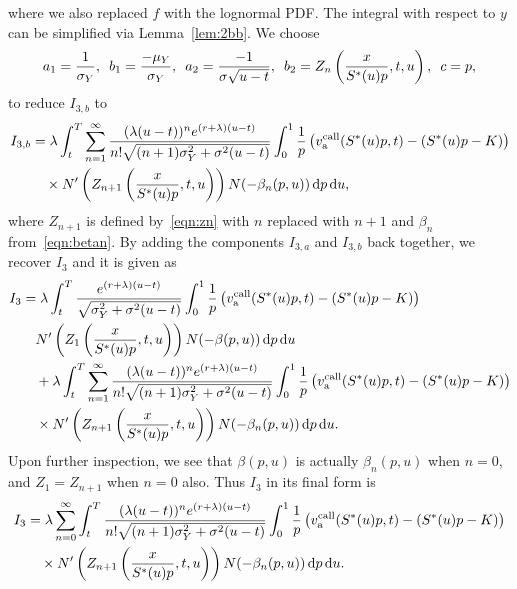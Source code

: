 		where we also replaced $f$ with the lognormal PDF. The integral with respect to $y$ can be simplified via Lemma~\ref{lem:2bb}. We choose
		$$
			a_1 = \frac{1}{\sigma_Y}, \enskip b_1 = \frac{-\mu_Y}{\sigma_Y}, \enskip a_2 = \frac{-1}{\sigma\sqrt{u-t}}, \enskip
			b_2 = Z_n\left( \frac{x}{S^*(u)p}, t, u \right), \enskip c = p,
		$$
		to reduce $I_{3,b}$ to
		\begin{align*}
			I_{3,b} &= \lambda \int_t^T \displaystyle\sum\limits_{n=1}^{\infty} \frac{(\lambda(u-t))^ne^{(r+\lambda)(u-t)}}{n!\sqrt{(n+1)\sigma_Y^2 + \sigma^2(u-t)}}\int_0^1 \frac{1}{p}\left( v_{\text{a}}^{\text{call}}(S^*(u)p,t) - (S^*(u)p - K) \right) \\
			&\quad {} \times N'\left( Z_{n+1}\left( \frac{x}{S^*(u)p}, t, u \right)\right)N(-\beta_n(p,u))  \, \mathrm d p \, \mathrm d u,
		\end{align*}
		where $Z_{n+1}$ is defined by~\eqref{eqn:zn} with $n$ replaced with $n+1$ and $\beta_n$ from~\eqref{eqn:betan}. By adding the components $I_{3,a}$ and $I_{3,b}$ back together, we recover $I_3$ and it is given as
		\begin{align*}
			I_3 &=   \lambda  \int_t^T \frac{e^{(r+\lambda)(u-t)}}{\sqrt{\sigma_Y^2 + \sigma^2(u-t)}} \int_0^1 \frac{1}{p} \left( v_{\text{a}}^{\text{call}}(S^*(u)p,t) - (S^*(u)p - K) \right)  \\
			&\quad {} N'\left( Z_1 \left( \frac{x}{S^*(u)p}, t, u \right)\right)N(-\beta(p,u)) \, \mathrm d p \, \mathrm d u \\
			& \quad{} + \lambda \int_t^T \displaystyle\sum\limits_{n=1}^{\infty} \frac{(\lambda(u-t))^ne^{(r+\lambda)(u-t)}}{n!\sqrt{(n+1)\sigma_Y^2 + \sigma^2(u-t)}}\int_0^1 \frac{1}{p}\left( v_{\text{a}}^{\text{call}}(S^*(u)p,t) - (S^*(u)p - K) \right) \\
			&\quad {} \times N'\left( Z_{n+1}\left( \frac{x}{S^*(u)p}, t, u \right)\right)N(-\beta_n(p,u))  \, \mathrm d p \, \mathrm d u.
		\end{align*}
		Upon further inspection, we see that $\beta(p,u)$ is actually $\beta_n(p,u)$ when $n=0$, and $Z_1 = Z_{n+1}$ when $n=0$ also. Thus $I_3$ in its final form is
		\begin{equation}
			\label{eqn:I3put}
			\begin{split}
			I_3 &= \lambda \displaystyle\sum\limits_{n=0}^{\infty} \int_t^T  \frac{(\lambda(u-t))^ne^{(r+\lambda)(u-t)}}{n!\sqrt{(n+1)\sigma_Y^2 + \sigma^2(u-t)}}\int_0^1 \frac{1}{p}\left( v_{\text{a}}^{\text{call}}(S^*(u)p,t) - (S^*(u)p - K) \right) \\
			&\quad {} \times N'\left( Z_{n+1}\left( \frac{x}{S^*(u)p}, t, u \right)\right)N(-\beta_n(p,u))  \, \mathrm d p \, \mathrm d u.
			\end{split}
		\end{equation}
